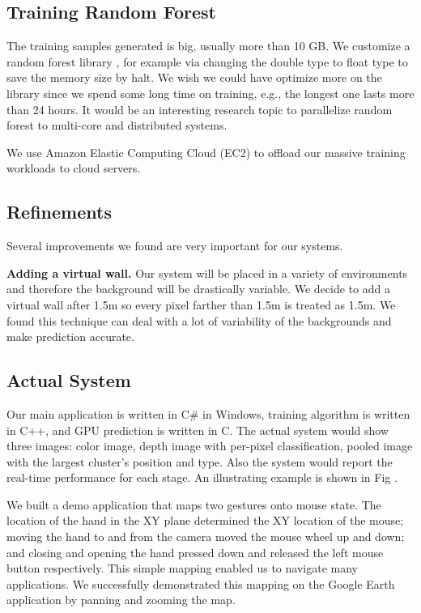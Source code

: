 \subsection{Training Random Forest}

The training samples generated is big, usually more than 10 GB. We customize a random forest library \cite{alglib}, for example via changing the double type to float type to save the memory size by halt. We wish we could have optimize more on the library since we spend some long time on training, e.g., the longest one lasts more than 24 hours. It would be an interesting research topic to parallelize random forest to multi-core and distributed systems.     

We use Amazon Elastic Computing Cloud (EC2) to offload our massive training workloads to cloud servers.  

\subsection{Refinements}

Several improvements we found are very important for our systems.

\textbf{Adding a virtual wall.} Our system will be placed in a variety of environments and therefore the background will be drastically variable. We decide to add a virtual wall after 1.5m so every pixel farther than 1.5m is treated as 1.5m. We found this technique can deal with a lot of variability of the backgrounds and make prediction accurate. 


\subsection{Actual System}

Our main application is written in C\# in Windows, training algorithm is written in C++, and GPU prediction is written in C. The actual system would show three images: color image, depth image with per-pixel classification, pooled image with the largest cluster's position and type. Also the system would report the real-time performance for each stage. An illustrating example is shown in Fig .

We built a demo application that maps two gestures onto mouse state. The location of the hand in the XY plane determined the XY location of the mouse; moving the hand to and from the camera moved the mouse wheel up and down; and closing and opening the hand pressed down and released the left mouse button respectively. This simple mapping enabled us to navigate many applications. We successfully demonstrated this mapping on the Google Earth application \cite{googleearth} by panning and zooming the map.
